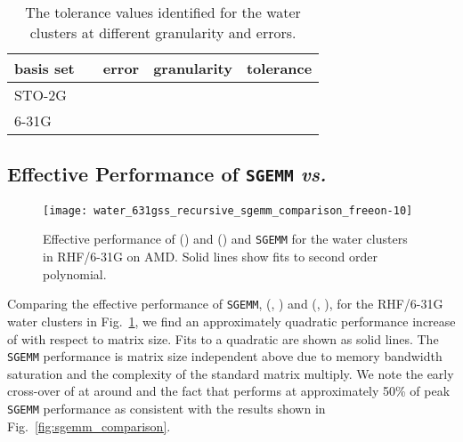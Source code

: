 \begin{table}
\caption{\label{table:tolerance_values} The tolerance values identified for the
water clusters at different \SpAMM{} granularity and errors.}
\begin{center}
\begin{tabular}{lllcl}
\hline
\hline
basis set                       & \hspace{0.2cm} & error                      & granularity    & tolerance \\
\hline
\multirow{4}{*}{STO-2G}         &                & \multirow{2}{*}{} &  &  \\
                                &                &                            &  &  \\
\cline{3-5}
                                &                & \multirow{2}{*}{} &  &  \\
                                &                &                            &  &  \\
\cline{1-5}
\multirow{4}{*}{6-31G} &                & \multirow{2}{*}{} &  &  \\
                                &                &                            &  &  \\
\cline{3-5}
                                &                & \multirow{2}{*}{} &  &  \\
                                &                &                            &  &  \\
\hline
\hline
\end{tabular}
\end{center}
\end{table}

\subsection{Effective Performance of {\tt SGEMM} \emph{vs.}~\SpAMM{}}

\begin{figure}
\texttt{[image: water\_631gss\_recursive\_sgemm\_comparison\_freeon-10]}
\caption{\label{fig:water_631gss_sgemm_comparison_AMD} Effective performance of
\SpAMM{}() and \SpAMM{}() and {\tt SGEMM} for the water clusters in
RHF/6-31G on AMD. Solid lines show fits to second order polynomial.}
\end{figure}

Comparing the effective performance of {\tt SGEMM}, \SpAMM{}(,
) and \SpAMM{}(, ), for the RHF/6-31G water clusters in
Fig.~\ref{fig:water_631gss_sgemm_comparison_AMD}, we find an approximately
quadratic performance increase of \SpAMM{} with respect to matrix size. Fits to
a quadratic are shown as solid lines. The {\tt SGEMM} performance is matrix
size independent above  due to memory bandwidth saturation and
the  complexity of the standard matrix
multiply. We note the early cross-over of \SpAMM{} at around  and
the fact that \SpAMM{} performs at approximately 50\% of peak {\tt SGEMM}
performance as  consistent with the results shown in
Fig.~\ref{fig:sgemm_comparison}.

